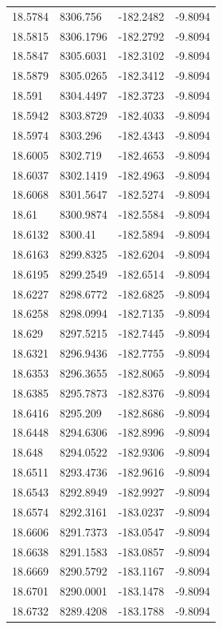 \begin{table}[H]
\begin{tabular}{llll}
18.5784 & 8306.756 & -182.2482 & -9.8094 \\
18.5815 & 8306.1796 & -182.2792 & -9.8094 \\
18.5847 & 8305.6031 & -182.3102 & -9.8094 \\
18.5879 & 8305.0265 & -182.3412 & -9.8094 \\
18.591 & 8304.4497 & -182.3723 & -9.8094 \\
18.5942 & 8303.8729 & -182.4033 & -9.8094 \\
18.5974 & 8303.296 & -182.4343 & -9.8094 \\
18.6005 & 8302.719 & -182.4653 & -9.8094 \\
18.6037 & 8302.1419 & -182.4963 & -9.8094 \\
18.6068 & 8301.5647 & -182.5274 & -9.8094 \\
18.61 & 8300.9874 & -182.5584 & -9.8094 \\
18.6132 & 8300.41 & -182.5894 & -9.8094 \\
18.6163 & 8299.8325 & -182.6204 & -9.8094 \\
18.6195 & 8299.2549 & -182.6514 & -9.8094 \\
18.6227 & 8298.6772 & -182.6825 & -9.8094 \\
18.6258 & 8298.0994 & -182.7135 & -9.8094 \\
18.629 & 8297.5215 & -182.7445 & -9.8094 \\
18.6321 & 8296.9436 & -182.7755 & -9.8094 \\
18.6353 & 8296.3655 & -182.8065 & -9.8094 \\
18.6385 & 8295.7873 & -182.8376 & -9.8094 \\
18.6416 & 8295.209 & -182.8686 & -9.8094 \\
18.6448 & 8294.6306 & -182.8996 & -9.8094 \\
18.648 & 8294.0522 & -182.9306 & -9.8094 \\
18.6511 & 8293.4736 & -182.9616 & -9.8094 \\
18.6543 & 8292.8949 & -182.9927 & -9.8094 \\
18.6574 & 8292.3161 & -183.0237 & -9.8094 \\
18.6606 & 8291.7373 & -183.0547 & -9.8094 \\
18.6638 & 8291.1583 & -183.0857 & -9.8094 \\
18.6669 & 8290.5792 & -183.1167 & -9.8094 \\
18.6701 & 8290.0001 & -183.1478 & -9.8094 \\
18.6732 & 8289.4208 & -183.1788 & -9.8094 \\

\end{tabular}
\end{table}
